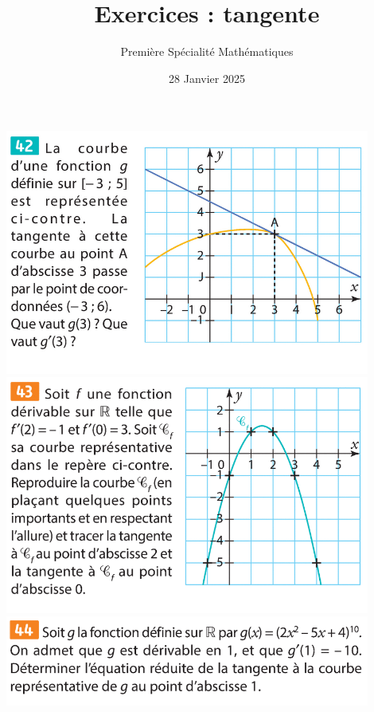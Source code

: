 \documentclass{article}
\title{Exercices : tangente}
\author{Première Spécialité Mathématiques}
\date{28 Janvier 2025}
\begin{document}
\maketitle

\begin{center}
\includegraphics[width=0.9\textwidth]{Exercice__tangente_1.png}
\includegraphics[width=0.9\textwidth]{Exercice__tangente_2.png}
\includegraphics[width=0.9\textwidth]{Exercice__tangente_3.png}
\end{center}
\end{document}
